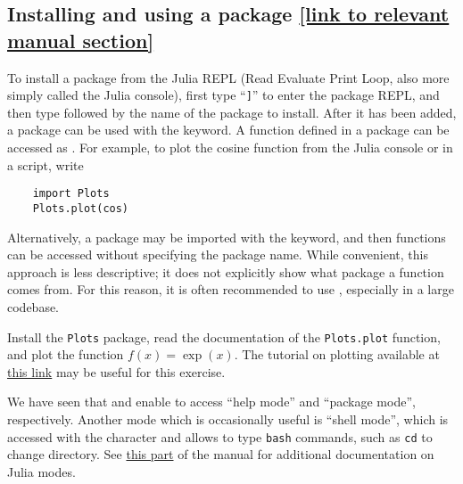 
\subsection*{Installing and using a package {\footnotesize \href{https://docs.julialang.org/en/v1/stdlib/Pkg/}{[link to relevant manual section]}}}%
\label{sub:installing_and_using_a_package}
To install a package from the Julia REPL (Read Evaluate Print Loop, also more simply called the Julia console),
first type ``\texttt{]}'' to enter the package REPL,
and then type  followed by the name of the package to install.
After it has been added, a package can be used with the  keyword.
A function  defined in a package  can be accessed as .
For example, to plot the cosine function from the Julia console or in a script, write
\begin{verbatim}
    import Plots
    Plots.plot(cos)
\end{verbatim}

Alternatively, a package may be imported with the  keyword,
and then functions can be accessed without specifying the package name.
While convenient, this approach is less descriptive;
it does not explicitly show what package a function comes from.
For this reason, it is often recommended to use ,
especially in a large codebase.

\begin{task}
    Install the \texttt{Plots} package,
    read the documentation of the \texttt{Plots.plot} function,
    and plot the function $f(x) = \exp(x)$.
    The tutorial on plotting available at \href{https://docs.juliaplots.org/latest/tutorial/} {this link}
    may be useful for this exercise.
\end{task}

\begin{remark}
    We have seen that  and \julia{]} enable to access ``help mode'' and ``package mode'', respectively.
    Another mode which is occasionally useful is ``shell mode'',
    which is accessed with the character \julia{;} and allows to type \texttt{bash} commands,
    such as \texttt{cd} to change directory.
    See \href{https://docs.julialang.org/en/v1/stdlib/REPL/}{this part} of the manual for additional documentation on Julia modes.
\end{remark}

